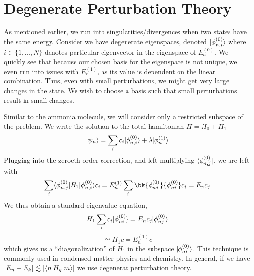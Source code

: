 \section{Degenerate Perturbation Theory}
As mentioned earlier, we run into singularities/divergences when two states have the same energy. Consider we have degenerate eigenspaces, denoted \(\lvert\phi_{n,i}^{(0)}\rangle\) where \(i\in\{1,\dots, N\}\) denotes particular eigenvector in the eigenspace of \(E_n^{(0)}\). We quickly see that because our chosen basis for the eigenspace is not unique, we even run into issues with \(E_n^{(1)}\), as its value is dependent on the linear combination. Thus, even with small perturbations, we might get very large changes in the state. We wish to choose a basis such that small perturbations result in small changes.

Similar to the ammonia molecule, we will consider only a restricted subspace of the problem. We write the solution to the total hamiltonian \(H = H_0+H_1\)
\[\lvert\psi_n\rangle = \sum_{i} c_i \lvert\phi_{n,i}^{(0)}\rangle+\lambda \lvert\phi_n^{(1)}\rangle\]
Plugging into the zeroeth order correction, and left-multiplying \(\langle\phi_{n,j}^{(0)}\rvert\), we are left with
\[\sum_i \b{\f_{n,j}^{(0)}}H_1\k{\f_{n,i}^{(0)}}c_i = E_n^{(1)}\sum_i\bk{\f_{nj}^{(0)}}{\f_{ni}^{(0)}}c_i = E_nc_j\]
We thus obtain a standard eigenvalue equation,
\[H_1\sum_i c_i \lvert\phi_{ni}^{(0)}\rangle = E_nc_j\lvert\phi_{nj}^{(0)}\rangle\]
\[\simeq H_1c = E_n^{(1)}c\]
which gives us a ``diagonalization'' of \(H_1\) in the subspace \(\lvert\phi_{ni}^{(0)}\rangle\). This technique is commonly used in condensed matter physics and chemistry. In general, if we have \(\left|E_n-E_k\right|\lesssim \left|\langle n\rvert H_q\lvert m\rangle\right|\) we use degenerat perturbation theory.

